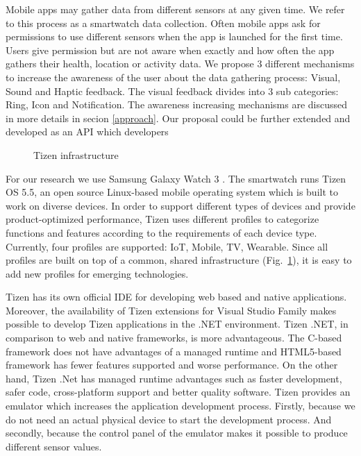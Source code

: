 \documentclass[conference, a4paper, 10pt, twocolumn]{IEEEtran}
\begin{document}
Mobile apps may gather data from different sensors at any given time. We refer to this process as a smartwatch data collection. Often mobile apps ask for permissions to use different sensors when the app is launched for the first time. Users give permission but are not aware when exactly and how often the app gathers their health, location or activity data. We propose 3 different mechanisms to increase the awareness of the user about the data gathering process: Visual, Sound and Haptic feedback. The visual feedback divides into 3 sub categories: Ring, Icon and Notification. The awareness increasing mechanisms are discussed in more details in secion \ref{approach}. Our proposal could be further extended and developed as an API which developers 

\begin{figure}[t]
\caption{Tizen infrastructure}
\label{fig:tizen}
\end{figure}

For our research we use Samsung Galaxy Watch 3 \cite{galaxyWatch3}. The smartwatch runs Tizen OS 5.5, an open source Linux-based mobile operating system which is built to work on diverse devices. In order to support different types of devices and provide product-optimized performance, Tizen uses different profiles to categorize functions and features according to the requirements of each device type. Currently, four profiles are supported: IoT, Mobile, TV, Wearable. Since all profiles are built on top of a common, shared infrastructure (Fig.~\ref{fig:tizen}), it is easy to add new profiles for emerging technologies.\cite{tizen} 

Tizen has its own official IDE for developing web based and native applications. Moreover, the availability of Tizen extensions for Visual Studio Family makes possible to develop Tizen applications in the .NET environment. Tizen .NET, in comparison to web and native frameworks, is more advantageous. The C-based framework does not have advantages of a managed runtime and HTML5-based framework has fewer features supported and worse performance. On the other hand, Tizen .Net has managed runtime advantages such as faster development, safer code, cross-platform support and better quality software. Tizen provides an emulator which increases the application development process. Firstly, because we do not need an actual physical device to start the development process. And secondly, because the control panel of the emulator makes it possible to produce different sensor values.\cite{tizen}
\end{document}
